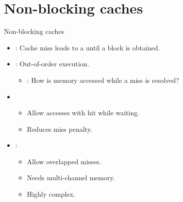\section{Non-blocking caches}

\begin{frame}[t]{Non-blocking caches}
\begin{itemize}
  \item {}: 
        Cache miss leads to a  until a block is obtained.

  \item {}: Out-of-order execution.
    \begin{itemize}
      \item {}: 
            How is memory accessed while a miss is resolved?
    \end{itemize}

  \item {}
    \begin{itemize}
      \item Allow accesses with hit while waiting.
      \item Reduces miss penalty.
    \end{itemize}

  \item {}:
    \begin{itemize}
      \item Allow overlapped misses.
      \item Needs multi-channel memory.
      \item Highly complex.
    \end{itemize}
\end{itemize}
\end{frame}
